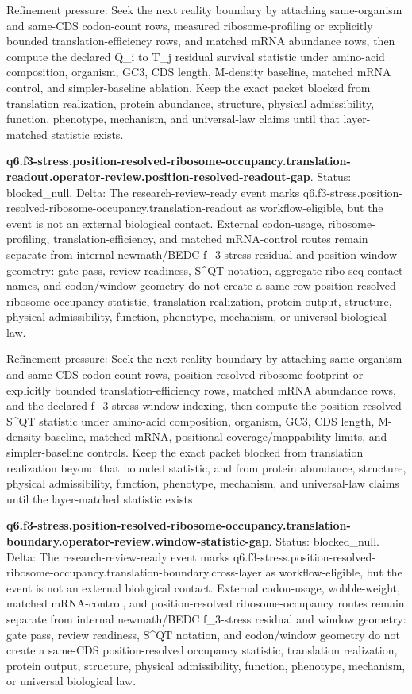 Refinement pressure: Seek the next reality boundary by attaching same-organism and same-CDS codon-count rows, measured ribosome-profiling or explicitly bounded translation-efficiency rows, and matched mRNA abundance rows, then compute the declared Q\_i to T\_j residual survival statistic under amino-acid composition, organism, GC3, CDS length, M-density baseline, matched mRNA control, and simpler-baseline ablation. Keep the exact packet blocked from translation realization, protein abundance, structure, physical admissibility, function, phenotype, mechanism, and universal-law claims until that layer-matched statistic exists.

\textbf{q6.f3-stress.position-resolved-ribosome-occupancy.translation-readout.operator-review.position-resolved-readout-gap}. Status: blocked\_null. Delta: The research-review-ready event marks q6.f3-stress.position-resolved-ribosome-occupancy.translation-readout as workflow-eligible, but the event is not an external biological contact. External codon-usage, ribosome-profiling, translation-efficiency, and matched mRNA-control routes remain separate from internal newmath/BEDC f\_3-stress residual and position-window geometry: gate pass, review readiness, S\textasciicircum{}QT notation, aggregate ribo-seq contact names, and codon/window geometry do not create a same-row position-resolved ribosome-occupancy statistic, translation realization, protein output, structure, physical admissibility, function, phenotype, mechanism, or universal biological law.

Refinement pressure: Seek the next reality boundary by attaching same-organism and same-CDS codon-count rows, position-resolved ribosome-footprint or explicitly bounded translation-efficiency rows, matched mRNA abundance rows, and the declared f\_3-stress window indexing, then compute the position-resolved S\textasciicircum{}QT statistic under amino-acid composition, organism, GC3, CDS length, M-density baseline, matched mRNA, positional coverage/mappability limits, and simpler-baseline controls. Keep the exact packet blocked from translation realization beyond that bounded statistic, and from protein abundance, structure, physical admissibility, function, phenotype, mechanism, and universal-law claims until the layer-matched statistic exists.

\textbf{q6.f3-stress.position-resolved-ribosome-occupancy.translation-boundary.operator-review.window-statistic-gap}. Status: blocked\_null. Delta: The research-review-ready event marks q6.f3-stress.position-resolved-ribosome-occupancy.translation-boundary.cross-layer as workflow-eligible, but the event is not an external biological contact. External codon-usage, wobble-weight, matched mRNA-control, and position-resolved ribosome-occupancy routes remain separate from internal newmath/BEDC f\_3-stress residual and window geometry: gate pass, review readiness, S\textasciicircum{}QT notation, and codon/window geometry do not create a same-CDS position-resolved occupancy statistic, translation realization, protein output, structure, physical admissibility, function, phenotype, mechanism, or universal biological law.

